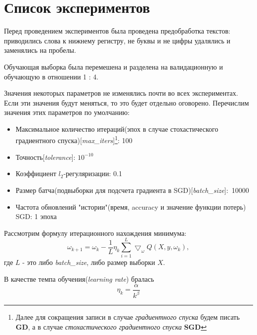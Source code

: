 \section{\huge Список экспериментов}
Перед проведением экспериментов была проведена предобработка текстов: приводились слова к нижнему регистру, не буквы и не цифры удалялись и заменялись на пробелы.

Обучающая выборка была перемешена и разделена на валидационную и обучающую в отношении 1 : 4.

 Значения некоторых параметров не изменялись почти во всех экспериментах. Если эти значения будут меняться, то это будет отдельно оговорено. Перечислим значения этих параметров по умолчанию:
\begin{itemize}
	\item 
	Максимальное количество итераций(эпох в случае стохастического градиентного спуска)[{\sl max\_iters}]\footnote{Далее для сокращения записи в случае {\itshape градиентного спуска} будем писать {\bfseries GD}, а в случае {\itshape стохастического градиентного спуска} {\bfseries SGD}}: 100
	\item  
	Точность[{\sl tolerance}]: $10^{-10}$
	\item
	Коэффициент $l_2$-регуляризации: 0.1
	\item Размер батча(подвыборки для подсчета градиента в SGD)[{\sl batch\_size}]:~10000 
	\item Частота обновлений "истории"(время, accuracy и значение функции потерь) SGD: 1 эпоха
\end{itemize}

Рассмотрим формулу итерационного нахождения минимума:
\begin{equation}
	\omega_{k+1} = \omega_k - \frac{1}{L}\eta_k\sum_{i=1}^L\bigtriangledown_\omega Q(X,y,\omega_k),
\label{grad}
\end{equation}
где $L$ - это либо {\sl batch\_size}, либо размер выборки $X$.

В качестве темпа обучения({\itshape learning rate}) бралась 
\begin{equation}
	\eta_k =\frac{\alpha}{k^\beta}\label{step}
\end{equation}